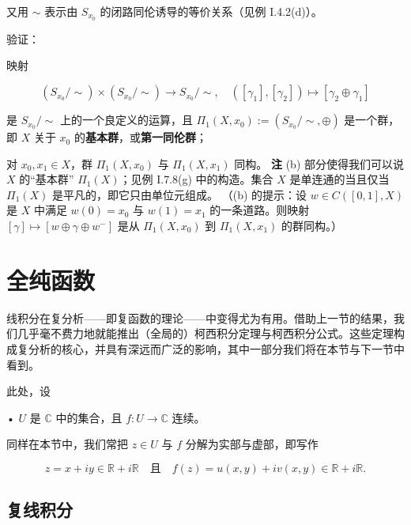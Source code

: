 \begin{exercises}
又用 $ \sim $ 表示由 $ S_{x_{0}} $ 的闭路同伦诱导的等价关系（见例 I.4.2(d)）。

验证：

\begin{items}
\item

映射

\[
(S_{x_{0}}/\!\sim)\times(S_{x_{0}}/\!\sim) \to S_{x_{0}}/\!\sim , \quad ([\gamma_{1}],[\gamma_{2}]) \mapsto [\gamma_{2}\oplus\gamma_{1}]
\]

是 $ S_{x_{0}}/\!\sim $ 上的一个良定义的运算，且 $ \Pi_{1}(X,x_{0}) := (S_{x_{0}}/\!\sim,\oplus) $ 是一个群，即 $ X $ 关于 $ x_{0} $ 的\textbf{基本群}，或\textbf{第一同伦群}；

\item

对 $ x_{0},x_{1} \in X $，群 $ \Pi_{1}(X,x_{0}) $ 与 $ \Pi_{1}(X,x_{1}) $ 同构。
\textbf{注} (b) 部分使得我们可以说 $ X $ 的“基本群” $ \Pi_{1}(X) $；见例 I.7.8(g) 中的构造。集合 $ X $ 是单连通的当且仅当 $ \Pi_{1}(X) $ 是平凡的，即它只由单位元组成。
（(b) 的提示：设 $ w \in C([0,1],X) $ 是 $ X $ 中满足 $ w(0) = x_{0} $ 与 $ w(1) = x_{1} $ 的一条道路。则映射 $ [\gamma] \mapsto [w\oplus\gamma\oplus w^{-}] $ 是从 $ \Pi_{1}(X,x_{0}) $ 到 $ \Pi_{1}(X,x_{1}) $ 的群同构。）

\end{items}

\end{exercises}

\section{全纯函数}

线积分在复分析——即复函数的理论——中变得尤为有用。借助上一节的结果，我们几乎毫不费力地就能推出（全局的）柯西积分定理与柯西积分公式。这些定理构成复分析的核心，并具有深远而广泛的影响，其中一部分我们将在本节与下一节中看到。

此处，设

• $ U $ 是 $ \mathbb{C} $ 中的集合，且 $ f : U \to \mathbb{C} $ 连续。

同样在本节中，我们常把 $ z \in U $ 与 $ f $ 分解为实部与虚部，即写作

\[
z = x + iy \in \mathbb{R} + i\mathbb{R} \quad \text{且} \quad f(z) = u(x,y) + iv(x,y) \in \mathbb{R} + i\mathbb{R} .
\]

\subsection*{复线积分}

